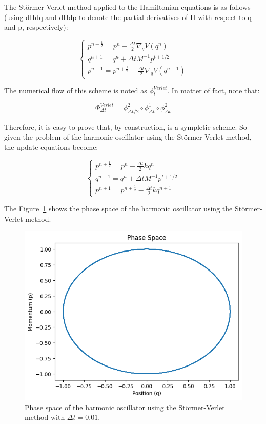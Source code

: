 \documentclass{report}
\begin{document}
The Störmer-Verlet method applied to the Hamiltonian equations is as follows (using dHdq and dHdp to denote the partial derivatives of H with respect to q and p, respectively):

\begin{equation}
	\begin{cases}
		p^{n + \frac{1}{2}} = p^n - \frac{\Delta t}{2} \nabla_q V(q^n) \\
		q^{n+1} = q^{n} + \Delta t M^{-1} p^{t+1/2} \\
		p^{n+1} = p^{n+\frac{1}{2}} - \frac{\Delta t}{2} \nabla_q V(q^{n+1})
	\end{cases}
	\label{eq:stormerverlet}
\end{equation}

The numerical flow of this scheme is noted as \(\phi^{Verlet}_t\). In matter of fact, note that:

\[
	\Phi^{Verlet}_{\Delta t} = \phi^2_{\Delta t/2} \circ \phi^1_{\Delta t} \circ \phi^2_{\Delta t}
\]


Therefore, it is easy to prove that, by construction, is a sympletic scheme. So given the problem of the harmonic oscillator using the Störmer-Verlet method, the update equations become:

\begin{equation}
	\begin{cases}
		p^{n + \frac{1}{2}} = p^n - \frac{\Delta t}{2} kq^n \\
		q^{n+1} = q^{n} + \Delta t M^{-1} p^{t+1/2} \\
		p^{n+1} = p^{n+\frac{1}{2}} - \frac{\Delta t}{2} kq^{n+1}
	\end{cases}
	\label{eq:stormerverletharmonic}
\end{equation}

The Figure~\ref{fig:stormerverletphase} shows the phase space of the harmonic oscillator using the Störmer-Verlet method.

\begin{figure}[H]
	\centering
	\includegraphics[width=0.5\linewidth]{./Figures/Sympletic/verletphase.png}
	\caption{Phase space of the harmonic oscillator using the Störmer-Verlet method with \(\Delta t = 0.01\).}
	\label{fig:stormerverletphase}
\end{figure}
\end{document}
